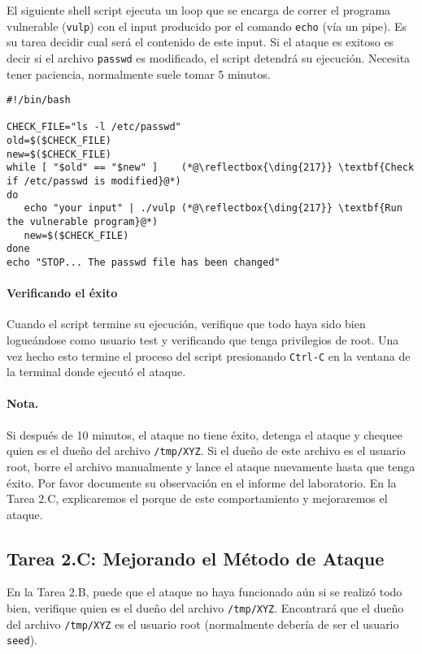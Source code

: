El siguiente shell script ejecuta un loop que se encarga de correr el programa vulnerable (\texttt{vulp}) con el input producido por el comando \texttt{echo} (vía un pipe).
Es su tarea decidir cual será el contenido de este input.
Si el ataque es exitoso es decir si el archivo \texttt{passwd} es modificado, el script detendrá su ejecución.
Necesita tener paciencia, normalmente suele tomar 5 minutos.

\begin{lstlisting}
#!/bin/bash

CHECK_FILE="ls -l /etc/passwd"
old=$($CHECK_FILE)
new=$($CHECK_FILE)
while [ "$old" == "$new" ]    (*@\reflectbox{\ding{217}} \textbf{Check if /etc/passwd is modified}@*)
do
   echo "your input" | ./vulp (*@\reflectbox{\ding{217}} \textbf{Run the vulnerable program}@*)
   new=$($CHECK_FILE)
done
echo "STOP... The passwd file has been changed"
\end{lstlisting}

\paragraph{Verificando el éxito}
Cuando el script termine su ejecución, verifique que todo haya sido bien logueándose como usuario test y verificando que tenga privilegios de root. Una vez hecho esto termine el proceso del script presionando \texttt{Ctrl-C} en la ventana de la terminal donde ejecutó el ataque.

\paragraph{Nota.}
Si después de 10 minutos, el ataque no tiene éxito, detenga el ataque y chequee quien es el dueño del archivo \texttt{/tmp/XYZ}. Si el dueño de este archivo es el usuario root, borre el archivo manualmente y lance el ataque nuevamente hasta que tenga éxito.
Por favor documente su observación en el informe del laboratorio.
En la Tarea 2.C, explicaremos el porque de este comportamiento y mejoraremos el ataque.



\subsection{Tarea 2.C: Mejorando el Método de Ataque}

En la Tarea 2.B, puede que el ataque no haya funcionado aún si se realizó todo bien, verifique quien es el dueño del archivo \texttt{/tmp/XYZ}. Encontrará que el dueño del archivo \texttt{/tmp/XYZ} es el usuario root (normalmente debería de ser el usuario \texttt{seed}).

